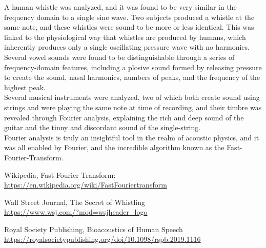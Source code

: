 \documentclass[aps,prl,reprint]{revtex4-2}
\begin{document}
A human whistle was analyzed, and it was found to be very
similar in the frequency domain to a single sine wave.
Two subjects produced a whistle at the same note, and
these whistles were sound to be more or less identical.
This was linked to the physiological way that whistles
are produced by humans, which inherently produces only
a single oscillating pressure wave with no harmonics. \\

Several vowel sounds were found to be distinguishable through
a series of frequency-domain features, including a plosive
sound formed by releasing pressure to create the sound,
nasal harmonics, numbers of peaks, and the frequency 
of the highest peak. \\

Several musical instruments were analyzed, two of which
both create sound using strings and were playing the same
note at time of recording, and their timbre was revealed
through Fourier analysis, explaining the rich and deep sound
of the guitar and the tinny and discordant sound of the
single-string. \\

Fourier analysis is truly an insightful tool in the
realm of acoustic physics, and it was all enabled
by Fourier, and the incredible algorithm known as 
the Fast-Fourier-Transform. 






\begin{thebibliography}{9}
Wikipedia, Fast Fourier Transform: \\
\href{https://en.wikipedia.org/wiki/Fast_Fourier_transform#History}{https://en.wikipedia.org/wiki/FastFouriertransform}


Wall Street Journal, The Secret of Whistling \\
\href{https://www.wsj.com/?mod=wsjheader_logo}{https://www.wsj.com/?mod=wsjheader_logo}


Royal Society Publishing, Bioacoustics of Human Speech \\
\href{https://royalsocietypublishing.org/doi/10.1098/rspb.2019.1116}{https://royalsocietypublishing.org/doi/10.1098/rspb.2019.1116}
\end{thebibliography}
\end{document}
